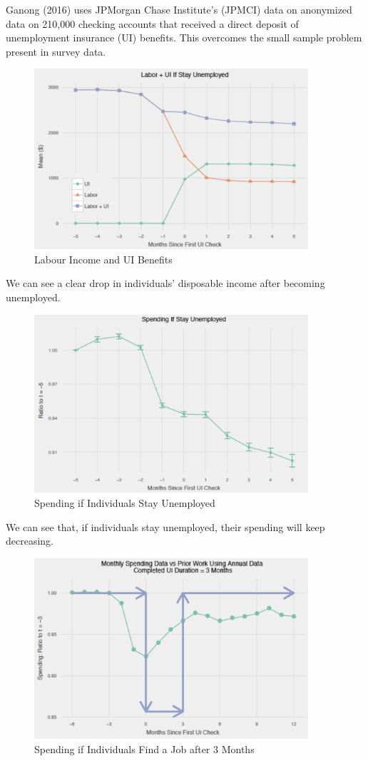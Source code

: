         Ganong (2016) uses JPMorgan Chase Institute’s (JPMCI) data on anonymized data on 210,000 checking accounts that received a direct deposit of unemployment insurance (UI) benefits. This overcomes the small sample problem present in survey data.
        \begin{figure}[H]
            \centering
            \includegraphics[width=4in]{images/ch1/Ganong_1.png}
            \caption{Labour Income and UI Benefits}
            \label{fig:Ganong_1}
        \end{figure}
        We can see a clear drop in individuals' disposable income after becoming unemployed.
        \begin{figure}[H]
            \centering
            \includegraphics[width=4in]{images/ch1/Ganong_2.png}
            \caption{Spending if Individuals Stay Unemployed}
            \label{fig:Ganong_2}
        \end{figure}
        We can see that, if individuals stay unemployed, their spending will keep decreasing.
        \begin{figure}[H]
            \centering
            \includegraphics[width=4in]{images/ch1/Ganong_3.png}
            \caption{Spending if Individuals Find a Job after 3 Months}
            \label{fig:Ganong_3}
        \end{figure}
